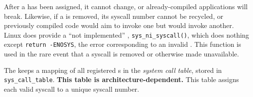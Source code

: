 After a  has been assigned, it cannot change, or already-compiled applications will break.
Likewise, if a  is removed, its syscall number cannot be recycled, or previously compiled code would aim to invoke one  but would invoke another.
Linux does provide a ``not implemented'' , \texttt{sys_ni_syscall()}, which does nothing except \texttt{return -ENOSYS}, the error corresponding to an invalid .
This function is used in the rare event that a syscall is removed or otherwise made unavailable.

The  keeps a mapping of all registered s in the \emph{system call table}, stored in \texttt{sys_call_table}.
\textbf{This table is architecture-dependent.}
This table assigns each valid syscall to a unique syscall number.


